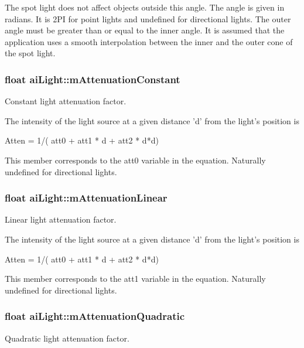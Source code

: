 The spot light does not affect objects outside this angle. The angle is given in radians. It is 2\-P\-I for point lights and undefined for directional lights. The outer angle must be greater than or equal to the inner angle. It is assumed that the application uses a smooth interpolation between the inner and the outer cone of the spot light. \hypertarget{structai_light_ae8804b3c309527ca0f85d676bab55710}{
\subsubsection[{m\-Attenuation\-Constant}]{\setlength{\rightskip}{0pt plus 5cm}float ai\-Light\-::m\-Attenuation\-Constant}}\label{structai_light_ae8804b3c309527ca0f85d676bab55710}
Constant light attenuation factor.

The intensity of the light source at a given distance 'd' from the light's position is 
\begin{DoxyCode}
Atten = 1/( att0 + att1 * d + att2 * d*d)
\end{DoxyCode}
 This member corresponds to the att0 variable in the equation. Naturally undefined for directional lights. \hypertarget{structai_light_aefda311eaa785ea345782dfa95be817c}{
\subsubsection[{m\-Attenuation\-Linear}]{\setlength{\rightskip}{0pt plus 5cm}float ai\-Light\-::m\-Attenuation\-Linear}}\label{structai_light_aefda311eaa785ea345782dfa95be817c}
Linear light attenuation factor.

The intensity of the light source at a given distance 'd' from the light's position is 
\begin{DoxyCode}
Atten = 1/( att0 + att1 * d + att2 * d*d)
\end{DoxyCode}
 This member corresponds to the att1 variable in the equation. Naturally undefined for directional lights. \hypertarget{structai_light_ab4fb07bfa40a807661b1ed1791838a6d}{
\subsubsection[{m\-Attenuation\-Quadratic}]{\setlength{\rightskip}{0pt plus 5cm}float ai\-Light\-::m\-Attenuation\-Quadratic}}\label{structai_light_ab4fb07bfa40a807661b1ed1791838a6d}
Quadratic light attenuation factor.

